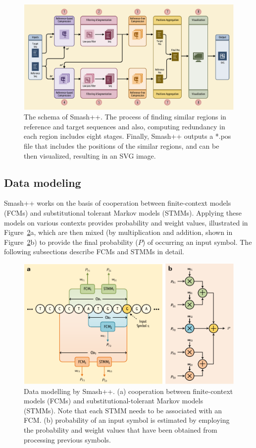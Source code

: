 \documentclass[a4paper,num-refs]{oup-contemporary}
\begin{document}
\begin{figure}[!t]
  \centering
  \includegraphics[width=.9\linewidth]{schema.pdf}
  \caption{The schema of Smash++. The process of finding similar regions in reference and target sequences and also, computing redundancy in each region includes eight stages. Finally, Smash++ outputs a *.pos file that includes the positions of the similar regions, and can be then visualized, resulting in an SVG image.}
  \label{fig.schema}
\end{figure}

\subsection{Data modeling}
Smash++ works on the basis of cooperation between finite-context models (FCMs) and substitutional tolerant Markov models (STMMs). Applying these models on various contexts provides probability and weight values, illustrated in Figure~\ref{fig.model}a, which are then mixed (by multiplication and addition, shown in Figure~\ref{fig.model}b) to provide the final probability ($P$) of occurring an input symbol. The following subsections describe FCMs and STMMs in detail.

\begin{figure}[!t]
  \centering
  \includegraphics[width=\linewidth]{data_model.pdf}
  \caption{Data modelling by Smash++. (a) cooperation between finite-context models (FCMs) and substitutional-tolerant Markov models (STMMs). Note that each STMM needs to be associated with an FCM. (b) probability of an input symbol is estimated by employing the probability and weight values that have been obtained from processing previous symbols.}
  \label{fig.model}
\end{figure}
\end{document}
